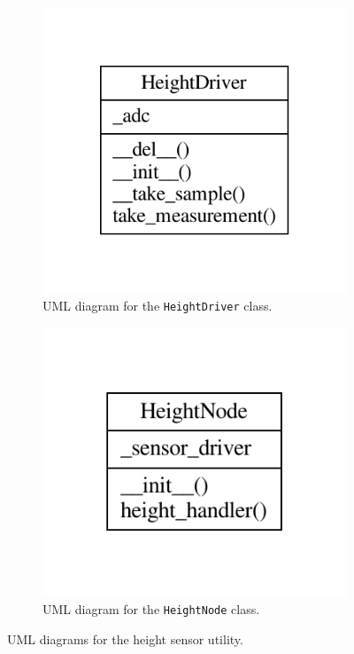 \documentclass{article}
\begin{document}
\begin{figure}[H]
    \begin{subfigure}{0.5\textwidth}
        \centering
        \includegraphics{images/UML/height_sensor/height_driver.pdf}
        \caption{UML diagram for the \texttt{HeightDriver} class.}
        \label{fig:height_uml_driver}
    \end{subfigure}
    \begin{subfigure}{0.5\textwidth}
        \centering
        \includegraphics{images/UML/height_sensor/height_node.pdf}
        \caption{UML diagram for the \texttt{HeightNode} class.}
        \label{fig:height_uml_node}
    \end{subfigure}
    \caption{UML diagrams for the height sensor utility.}
    \label{fig:height_uml}
\end{figure}
\end{document}
